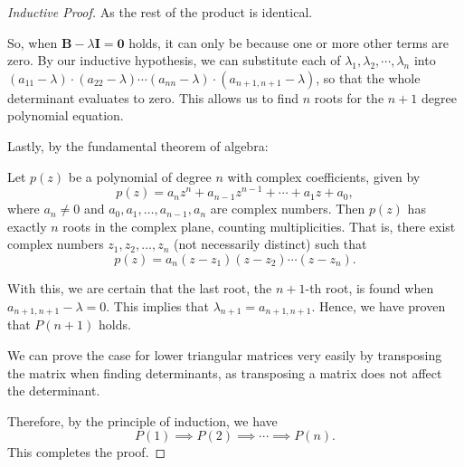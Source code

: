 \documentclass[12pt,a4paper]{article}
\begin{document}
\begin{proof}[Inductive Proof]
As the rest of the product is identical.

So, when \( \mathbf{B} - \lambda \mathbf{I} = \mathbf{0} \) holds, it can only be because one or more other terms are zero. By our inductive hypothesis, we can substitute each of \( \lambda_1, \lambda_2, \cdots, \lambda_n \) into \( (a_{11} - \lambda) \cdot (a_{22} - \lambda) \cdots (a_{nn} - \lambda) \cdot (a_{n+1,n+1} - \lambda) \), so that the whole determinant evaluates to zero. This allows us to find \( n \) roots for the \( n+1 \) degree polynomial equation.

Lastly, by the fundamental theorem of algebra:
\begin{theorem}
    Let \( p(z) \) be a polynomial of degree \( n \) with complex coefficients, given by
    \[
    p(z) = a_nz^n + a_{n-1}z^{n-1} + \cdots + a_1z + a_0,
    \]
    where \( a_n \neq 0 \) and \( a_0, a_1, \dots, a_{n-1}, a_n \) are complex numbers. Then \( p(z) \) has exactly \( n \) roots in the complex plane, counting multiplicities. That is, there exist complex numbers \( z_1, z_2, \dots, z_n \) (not necessarily distinct) such that
    \[
    p(z) = a_n(z - z_1)(z - z_2) \cdots (z - z_n).
    \]
\end{theorem}

With this, we are certain that the last root, the \( n+1 \)-th root, is found when \( a_{n+1,n+1} - \lambda = 0 \). This implies that \( \lambda_{n+1} = a_{n+1,n+1} \). Hence, we have proven that \( P(n+1) \) holds.

We can prove the case for lower triangular matrices very easily by transposing the matrix when finding determinants, as transposing a matrix does not affect the determinant.

Therefore, by the principle of induction, we have 
\[
P(1) \implies P(2) \implies \cdots \implies P(n).
\]
This completes the proof.
\end{proof}
\end{document}
